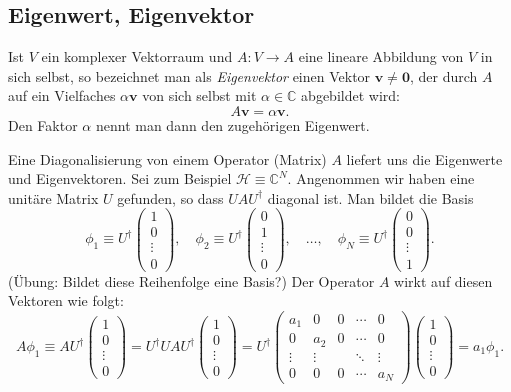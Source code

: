 \subsection{Eigenwert, Eigenvektor}
Ist $V$ ein komplexer Vektorraum und $A:V\rightarrow A$ eine lineare Abbildung von $V$ in sich selbst, so bezeichnet man als \emph{Eigenvektor} einen Vektor $\mathbf{v}\not=\mathbf{0}$, der durch $A$ auf ein Vielfaches 
$\alpha\mathbf{v}$ von sich selbst mit $\alpha\in\mathbb{C}$ abgebildet wird:
\begin{equation}
	A\mathbf{v} = \alpha \mathbf{v}.
\end{equation}
Den Faktor $\alpha$ nennt man dann den zugehörigen Eigenwert. 

Eine Diagonalisierung von einem Operator (Matrix) $A$ liefert uns die Eigenwerte und Eigenvektoren. Sei zum Beispiel $\mathcal{H} \equiv \mathbb{C}^N$. Angenommen wir haben eine unitäre Matrix $U$ gefunden, so dass $UAU^\dag$ diagonal ist. Man bildet die Basis 
\begin{equation}
	\phi_1 \equiv U^\dag \begin{pmatrix}
	1\\0\\ \vdots \\ 0
	\end{pmatrix}, \quad  \phi_2 \equiv U^\dag \begin{pmatrix}
	0\\1\\ \vdots \\ 0
	\end{pmatrix}, \quad \ldots, \quad \phi_N \equiv U^\dag \begin{pmatrix}
	0\\0\\ \vdots \\ 1
	\end{pmatrix}.
\end{equation}
(Übung: Bildet diese Reihenfolge eine Basis?) Der Operator $A$ wirkt auf diesen Vektoren wie folgt:
\begin{equation}
	A\phi_1 \equiv AU^\dag \begin{pmatrix}
	1\\0\\ \vdots \\ 0
	\end{pmatrix} = U^\dag U AU^\dag \begin{pmatrix}
	1\\0\\ \vdots \\ 0
	\end{pmatrix} = U^\dag \begin{pmatrix}
		a_1 & 0 & 0 & \cdots & 0 \\
		0 & a_2 & 0 & \cdots & 0 \\
		\vdots & \vdots &  & \ddots & \vdots \\
		0 & 0 & 0 & \cdots & a_N
	\end{pmatrix} \begin{pmatrix}
	1\\0\\ \vdots \\ 0
	\end{pmatrix} = a_1 \phi_1.
\end{equation}
